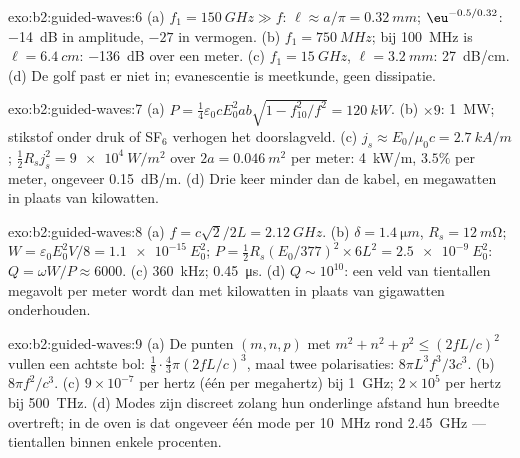 \begin{solution}{exo:b2:guided-waves:6}
(a) $f_1 = \qty{150}{GHz} \gg f$: $\ell \approx a/\pi = \qty{0.32}{mm}$;
$\eu^{-0.5/0.32}$: \qty{-14}{dB} in amplitude, $-27$ in vermogen. (b)
$f_1 = \qty{750}{MHz}$; bij \qty{100}{MHz} is $\ell = \qty{6.4}{cm}$:
\qty{-136}{dB} over een meter. (c) $f_1 = \qty{15}{GHz}$,
$\ell =
\qty{3.2}{mm}$: \qty{27}{dB/cm}. (d) De golf past er niet in;
evanescentie is meetkunde, geen dissipatie.
\end{solution}

\begin{solution}{exo:b2:guided-waves:7}
(a)
$P = \tfrac14\varepsilon_0cE_0^2ab\sqrt{1 - f_{10}^2/f^2} = \qty{120}{kW}$.
(b) $\times9$: \qty{1}{MW}; stikstof onder druk of SF$_6$ verhogen het
doorslagveld. (c) $j_s \approx E_0/\mu_0c = \qty{2.7}{kA/m}$;
$\tfrac12R_sj_s^2 = \qty{9e4}{W/m^2}$ over $2a =
\qty{0.046}{m^2}$ per
meter: \qty{4}{kW/m}, $3.5\%$ per meter, ongeveer \qty{0.15}{dB/m}. (d) Drie
keer minder dan de kabel, en megawatten in plaats van kilowatten.
\end{solution}

\begin{solution}{exo:b2:guided-waves:8}
(a) $f = c\sqrt2/2L = \qty{2.12}{GHz}$. (b) $\delta = \qty{1.4}{\micro m}$,
$R_s = \qty{12}{m\ohm}$; $W = \varepsilon_0E_0^2V/8 = \qty{1.1e-15}{}E_0^2$;
$P = \tfrac12R_s(E_0/377)^2 \times 6L^2 =
\qty{2.5e-9}{}E_0^2$:
$Q = \omega W/P \approx 6000$. (c) \qty{360}{kHz}; \qty{0.45}{\micro s}. (d)
$Q \sim 10^{10}$: een veld van tientallen megavolt per meter wordt dan met
kilowatten in plaats van gigawatten onderhouden.
\end{solution}

\begin{solution}{exo:b2:guided-waves:9}
(a) De punten $(m, n, p)$ met $m^2 + n^2 + p^2 \le (2fL/c)^2$ vullen een
achtste bol: $\tfrac18\cdot\tfrac43\pi(2fL/c)^3$, maal twee polarisaties:
$8\pi L^3f^3/3c^3$. (b) $8\pi f^2/c^3$. (c) $9 \times 10^{-7}$ per hertz
(één per megahertz) bij \qty{1}{GHz}; $2 \times 10^5$ per hertz bij
\qty{500}{THz}. (d) Modes zijn discreet zolang hun onderlinge afstand hun
breedte overtreft; in de oven is dat ongeveer één mode per \qty{10}{MHz}
rond \qty{2.45}{GHz} --- tientallen binnen enkele procenten.
\end{solution}

